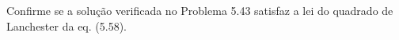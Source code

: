 Confirme se a solução verificada no Problema 5.43 satisfaz a lei do quadrado de Lanchester da eq. (5.58).
